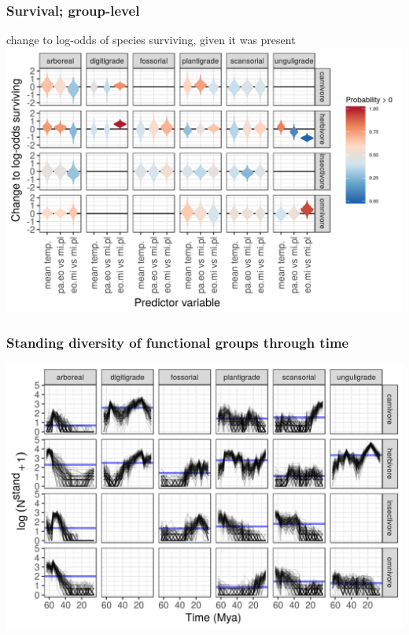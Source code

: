 \documentclass[aspectratio=169]{beamer}
\begin{document}
\begin{frame}
  \frametitle{Survival; group-level}
  \begin{center}
    change to log-odds of species surviving, given it was present
    \includegraphics[height=0.775\textheight,width=\textwidth,keepaspectratio=true]{figure/group_on_survival_bd}
  \end{center}
\end{frame}

\begin{frame}
  \frametitle{Standing diversity of functional groups through time}
  \begin{center}
    \includegraphics[height=0.8\textheight,width=\textwidth,keepaspectratio=true]{figure/ecotype_diversity}
  \end{center}
\end{frame}
\end{document}
